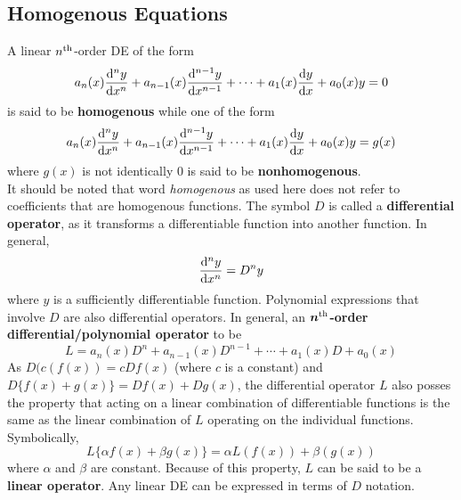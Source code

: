\documentclass[./Differential Equations]{subfiles}
\begin{document}
		\subsection{Homogenous Equations}
			A linear \(n^{\text{th}}\)-order DE of the form
				\[a_n(x)\dv[n]{y}{x} + a_{n - 1}(x)\dv[n - 1]{y}{x} + \cdots + a_1(x)\dv{y}{x} + a_0(x)y = 0\]
				is said to be \textbf{homogenous} while one of the form
				\[a_n(x)\dv[n]{y}{x} + a_{n - 1}(x)\dv[n - 1]{y}{x} + \cdots + a_1(x)\dv{y}{x} + a_0(x)y = g(x)\]
				where \(g(x)\) is not identically 0 is said to be \textbf{nonhomogenous}. \\
			It should be noted that word \textit{homogenous} as used here does not refer to coefficients that are homogenous functions.
				The symbol \(D\) is called a \textbf{differential operator}, as it transforms a differentiable function into another function. In general,
					\[\dv[n]{y}{x} = D^ny\]
					where \(y\) is a sufficiently differentiable function. Polynomial expressions that involve \(D\) are also differential operators. In general, an \textbf{\(\bm{n^{\text{th}}}\)-order differential/polynomial operator} to be
					\[L = a_n(x)D^n + a_{n - 1}(x)D^{n - 1} + \cdots + a_1(x)D + a_0(x)\]
				As \(D(c(f(x)) = cDf(x)\) (where \(c\) is a constant) and \(D\{f(x) + g(x)\} = Df(x) + Dg(x)\), the differential operator \(L\) also posses the property that acting on a linear combination of differentiable functions is the same as the linear combination of \(L\) operating on the individual functions. Symbolically,
					\[L\{\alpha f(x) + \beta g(x)\} = \alpha L(f(x)) + \beta (g(x))\]
					where \(\alpha\) and \(\beta\) are constant. Because of this property, \(L\) can be said to be a \textbf{linear operator}.
				Any linear DE can be expressed in terms of \(D\) notation.
\end{document}
